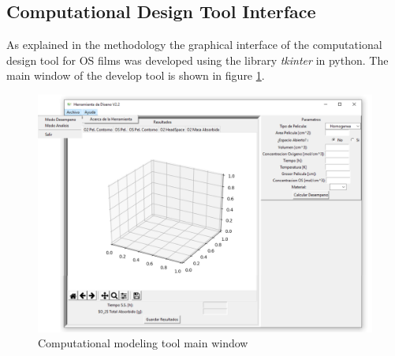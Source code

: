 \begin{refsection}
\section{Computational Design Tool Interface}
As explained in the methodology the graphical interface of the computational design tool for OS films was developed  using the library \textit{tkinter} in python. The main window of the develop tool is shown in figure \ref{fig:intefaz_principal}.  

\begin{figure}[ht]
    \centering
    \includegraphics[width=\linewidth]{Documento_Latex/Imagenes/Interfaz.png}
    \caption{Computational modeling tool main window}
    \label{fig:intefaz_principal}
\end{figure}


\end{refsection}
